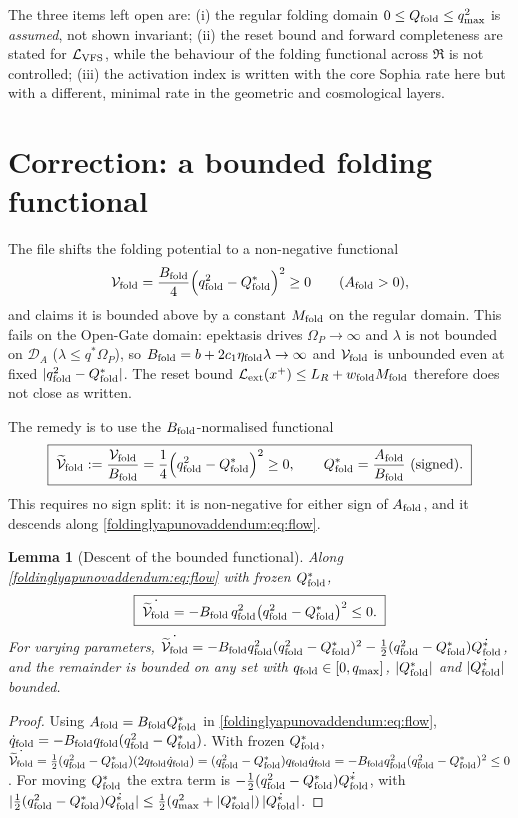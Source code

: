 \documentclass[11pt,a4paper,oneside]{book}
\newcommand{\Qf}{Q_{\rm fold}}
\newcommand{\LV}{\mathcal L_{\rm VFS}}
\newcommand{\DA}{\mathcal D_A}
\newcommand{\Om}{\Omega_P}
\newcommand{\reset}{\mathfrak{R}}
\newcommand{\qf}{q_{\rm fold}}
\newcommand{\Qs}{Q_{\rm fold}^{*}}
\newcommand{\Af}{A_{\rm fold}}
\newcommand{\Bf}{B_{\rm fold}}
\newcommand{\Vf}{\mathcal V_{\rm fold}}
\newcommand{\Vt}{\widetilde{\mathcal V}_{\rm fold}}
\newcommand{\Lext}{\mathcal L_{\rm ext}}
\newcommand{\etaf}{\eta_{\rm fold}}
\theoremstyle{plain}
\newtheorem{lemma}{Lemma}[chapter]
\theoremstyle{definition}
\theoremstyle{remark}
\begin{document}
The three items left open are: (i) the regular folding domain $0\le\Qf\le q_{\max}^2$ is \emph{assumed},
not shown invariant; (ii) the reset bound and forward completeness are stated for $\LV$, while the
behaviour of the folding functional across $\reset$ is not controlled; (iii) the activation index is
written with the core Sophia rate here but with a different, minimal rate in the geometric and
cosmological layers.

\section{Correction: a bounded folding functional}

The file shifts the folding potential to a non-negative functional
\begin{equation}
\Vf=\frac{\Bf}{4}\Bigl(\qf^{2}-\Qs\Bigr)^{2}\ge0
\qquad(\Af>0),
\end{equation}
and claims it is bounded above by a constant $M_{\rm fold}$ on the regular domain. This fails on the
Open-Gate domain: epektasis drives $\Om\to\infty$ and $\lambda$ is not bounded on $\DA$
($\lambda\le q^*\Om$), so $\Bf=b+2c_1\etaf\lambda\to\infty$ and $\Vf$ is unbounded even at fixed
$|\qf^{2}-\Qs|$. The reset bound $\Lext(x^+)\le L_R+w_{\rm fold}M_{\rm fold}$ therefore does not close as
written.

The remedy is to use the $\Bf$-normalised functional
\begin{equation}
\boxed{\;\Vt:=\frac{\Vf}{\Bf}=\frac14\Bigl(\qf^{2}-\Qs\Bigr)^{2}\ge0,\qquad
\Qs=\frac{\Af}{\Bf}\ \text{(signed)}.\;}
\end{equation}
This requires no sign split: it is non-negative for either sign of $\Af$, and it descends along
\eqref{foldinglyapunovaddendum:eq:flow}.

\begin{lemma}[Descent of the bounded functional]\label{foldinglyapunovaddendum:lem:descent}
Along \eqref{foldinglyapunovaddendum:eq:flow} with frozen $\Qs$,
\begin{equation}
\boxed{\;\dot{\Vt}=-\Bf\,\qf^{2}\bigl(\qf^{2}-\Qs\bigr)^{2}\le0.\;}
\end{equation}
For varying parameters,
$\dot{\Vt}=-\Bf\qf^{2}(\qf^{2}-\Qs)^{2}-\tfrac12(\qf^{2}-\Qs)\dot{\Qs}$,
and the remainder is bounded on any set with $\qf\in[0,q_{\max}]$, $|\Qs|$ and $|\dot{\Qs}|$ bounded.
\end{lemma}
\begin{proof}
Using $\Af=\Bf\Qs$ in \eqref{foldinglyapunovaddendum:eq:flow}, $\dot\qf=-\Bf\qf(\qf^{2}-\Qs)$. With frozen $\Qs$,
$\dot{\Vt}=\tfrac12(\qf^{2}-\Qs)(2\qf\dot\qf)=(\qf^{2}-\Qs)\qf\dot\qf
=-\Bf\qf^{2}(\qf^{2}-\Qs)^{2}\le0$. For moving $\Qs$ the extra term is
$-\tfrac12(\qf^{2}-\Qs)\dot{\Qs}$, with $|\tfrac12(\qf^{2}-\Qs)\dot{\Qs}|
\le\tfrac12(q_{\max}^{2}+|\Qs|)\,|\dot{\Qs}|$.
\end{proof}
\end{document}
